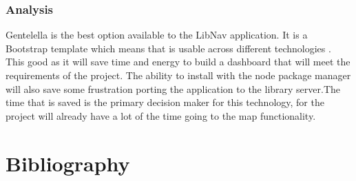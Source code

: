 \documentclass[letterpaper,10pt,titlepage, onecolumn, compsoc]{IEEEtran}
\begin{document}
\subsubsection{Analysis}
Gentelella is the best option available to the LibNav application. It is a Bootstrap template which means that is usable across different technologies . This good as it will save time and energy to build a dashboard that will meet the requirements of the project. The ability to install with the node package manager will also save some frustration porting the application to the library server.The time that is saved is the primary decision maker for this technology, for the project will already have a lot of the time going to the map functionality. 



\newpage
\section{Bibliography}


\end{document}
